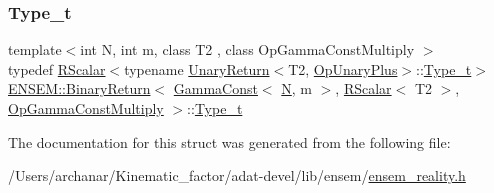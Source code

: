 \subsubsection{\texorpdfstring{Type\_t}{Type\_t}\hspace{0.1cm}{\footnotesize\ttfamily [3/3]}}
{\footnotesize\ttfamily template$<$int N, int m, class T2 , class Op\+Gamma\+Const\+Multiply $>$ \\
typedef \mbox{\hyperlink{classENSEM_1_1RScalar}{R\+Scalar}}$<$typename \mbox{\hyperlink{structENSEM_1_1UnaryReturn}{Unary\+Return}}$<$T2, \mbox{\hyperlink{structENSEM_1_1OpUnaryPlus}{Op\+Unary\+Plus}}$>$\+::\mbox{\hyperlink{structENSEM_1_1BinaryReturn_3_01GammaConst_3_01N_00_01m_01_4_00_01RScalar_3_01T2_01_4_00_01OpGammaConstMultiply_01_4_a488943521f764ace274eff3fb2af9517}{Type\+\_\+t}}$>$ \mbox{\hyperlink{structENSEM_1_1BinaryReturn}{E\+N\+S\+E\+M\+::\+Binary\+Return}}$<$ \mbox{\hyperlink{classENSEM_1_1GammaConst}{Gamma\+Const}}$<$ \mbox{\hyperlink{adat__devel_2lib_2hadron_2operator__name__util_8cc_a7722c8ecbb62d99aee7ce68b1752f337}{N}}, m $>$, \mbox{\hyperlink{classENSEM_1_1RScalar}{R\+Scalar}}$<$ T2 $>$, \mbox{\hyperlink{structENSEM_1_1OpGammaConstMultiply}{Op\+Gamma\+Const\+Multiply}} $>$\+::\mbox{\hyperlink{structENSEM_1_1BinaryReturn_3_01GammaConst_3_01N_00_01m_01_4_00_01RScalar_3_01T2_01_4_00_01OpGammaConstMultiply_01_4_a488943521f764ace274eff3fb2af9517}{Type\+\_\+t}}}



The documentation for this struct was generated from the following file\+:\begin{DoxyCompactItemize}
\item 
/\+Users/archanar/\+Kinematic\+\_\+factor/adat-\/devel/lib/ensem/\mbox{\hyperlink{adat-devel_2lib_2ensem_2ensem__reality_8h}{ensem\+\_\+reality.\+h}}\end{DoxyCompactItemize}
